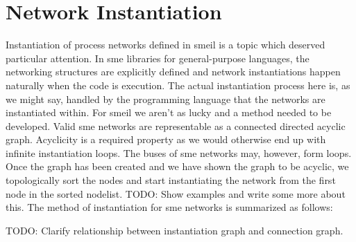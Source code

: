 \section{Network Instantiation}
Instantiation of process networks defined in \gls{smeil} is a topic which
deserved particular attention. In \gls{sme} libraries for general-purpose
languages, the networking structures are explicitly defined and network
instantiations happen naturally when the code is execution. The actual
instantiation process here is, as we might say, handled by the programming
language that the networks are instantiated within. For \gls{smeil} we aren't as
lucky and a method needed to be developed. Valid \gls{sme} networks are
representable as a connected directed acyclic graph. Acyclicity is a required
property as we would otherwise end up with infinite instantiation loops. The
buses of \gls{sme} networks may, however, form loops. Once the graph has been
created and we have shown the graph to be acyclic, we topologically sort the
nodes and start instantiating the network from the first node in the sorted
nodelist.  TODO: Show examples and write some more about this. The method of
instantiation for \gls{sme} networks is summarized as follows:

TODO: Clarify relationship between instantiation graph and connection graph.

